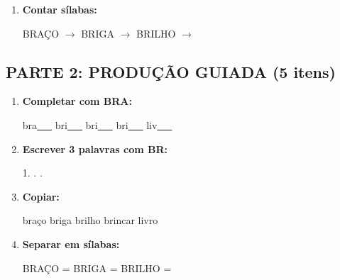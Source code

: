 \begin{exercicio}
\begin{enumerate}
  \item \textbf{Contar sílabas:}
  \begin{center}
  BRAÇO $\rightarrow$ \underline{\hspace{0.9cm}} \quad BRIGA $\rightarrow$ \underline{\hspace{0.9cm}} \quad BRILHO $\rightarrow$ \underline{\hspace{0.9cm}}
  \end{center}

\end{enumerate}

\subsection*{PARTE 2: PRODUÇÃO GUIADA (5 itens)}

\begin{enumerate}[resume]

  \item \textbf{Completar com BRA:}
  \begin{center}
  bra\underline{~~~} \quad bri\underline{~~~} \quad bri\underline{~~~} \quad bri\underline{~~~} \quad liv\underline{~~~}
  \end{center}

  \item \textbf{Escrever 3 palavras com BR:}
  \begin{center}
  1. \underline{\hspace{3cm}} . \underline{\hspace{3cm}} . \underline{\hspace{3cm}}
  \end{center}

  \item \textbf{Copiar:}
  \begin{center}
  braço \quad briga \quad brilho \quad brincar \quad livro
  \end{center}

  \item \textbf{Separar em sílabas:}
  \begin{center}
  BRAÇO = \underline{\hspace{1cm}} \underline{\hspace{1cm}} \quad BRIGA = \underline{\hspace{1cm}} \underline{\hspace{1cm}} \quad BRILHO = \underline{\hspace{1cm}} \underline{\hspace{1cm}}
  \end{center}


\end{enumerate}
\end{exercicio}
